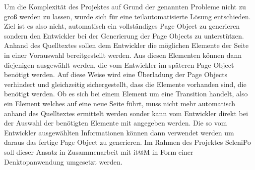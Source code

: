 Um die Komplexität des Projektes auf Grund der genannten Probleme nicht zu groß werden zu lassen, wurde sich für eine teilautomatisierte Lösung entschieden.
Ziel ist es also nicht, automatisch ein vollständiges Page Object zu generieren sondern den Entwickler bei der Generierung der Page Objects zu unterstützen. Anhand des Quelltextes sollen dem Entwickler die möglichen Elemente der Seite in einer Vorauswahl bereitgestellt werden. Aus diesen Elementen können dann diejenigen ausgewählt werden, die vom Entwickler im späteren Page Object benötigt werden. Auf diese Weise wird eine Überladung der Page Objects verhindert und gleichzeitig sichergestellt, dass die Elemente vorhanden sind, die benötigt werden.
Ob es sich bei einem Element um eine Transition handelt, also ein Element welches auf eine neue Seite führt, muss nicht mehr automatisch anhand des Quelltextes ermittelt werden sonder kann vom Entwickler direkt bei der Auswahl der benötigten Elemente mit angegeben werden.
Die so vom Entwickler ausgewählten Informationen können dann verwendet werden um daraus das fertige Page Object zu generieren.
Im Rahmen des Projektes SeleniPo soll dieser Ansatz in Zusammenarbeit mit it@M in Form einer Denktopanwendung umgesetzt werden. 

